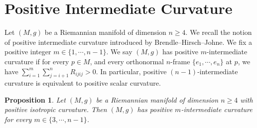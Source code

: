 \documentclass[11pt]{amsart}
\newtheorem{proposition}[theorem]{Proposition}
\theoremstyle{definition}
\begin{document}
\section{Positive Intermediate Curvature}
Let $(M,g)$ be a Riemannian manifold of dimension $n\geq 4$. We recall the notion of positive intermediate curvature introduced by Brendle--Hirsch--Johne. We fix a positive integer $m\in \{1,\cdots,n-1\}$. We say $(M,g)$ has positive $m$-intermediate curvature if for every $p\in M$, and every orthonormal $n$-frame $\{e_1,\cdots,e_n\}$ at $p$, we have $\sum_{i=1}^m\sum_{j=i+1}^nR_{ijij}>0$. In particular, positive $(n-1)$-intermediate curvature is equivalent to positive scalar curvature.
\begin{proposition}\label{prop:intermediate}
Let $(M,g)$ be a Riemannian manifold of dimension $n\geq 4$ with positive isotropic curvature. Then $(M,g)$ has positive $m$-intermediate curvature for every $m\in \{3,\cdots, n-1\}$.     
\end{proposition}
\end{document}
